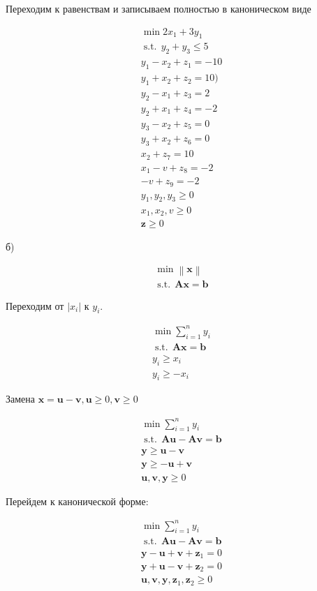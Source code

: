 \documentclass[12pt]{article}
\DeclareMathOperator*{\st}{s.t. }
\newcommand\norm[1]{\left\lVert#1\right\rVert}
\begin{document}
Переходим к равенствам и записываем полностью в каноническом виде

\begin{gather}
\min 2x_1+3y_1\\
\st\,y_2+y_3\leq 5\\
y_1 - x_2 + z_1 = - 10\\
y_1 + x_2 + z_2 = 10)\\
y_2 - x_1 + z_3 = 2\\
y_2 + x_1 + z_4 =  -2\\
y_3 - x_2 + z_5 = 0\\
y_3 + x_2 + z_6 = 0\\
x_2 + z_7 = 10\\
x_1 - v  + z_8 = -2\\
-v + z_9 = -2\\
y_1, y_2, y_3 \geq 0\\
x_1, x_2, v\geq 0\\
\textbf{z} \geq 0
\end{gather} 

б) 

\begin{gather}
\min \norm{\textbf{x}}\\
\st\,\textbf{Ax} = \textbf{b}
\end{gather} 

Переходим от $|x_i|$ к $y_i$.

\begin{gather}
\min \sum\limits_{i=1}^ny_i\\
\st\,\textbf{Ax} = \textbf{b}\\
y_i \geq x_i\\
y_i \geq -x_i
\end{gather}

Замена $\textbf{x} = \textbf{u} - \textbf{v}, \textbf{u}\geq 0, \textbf{v} \geq 0$

\begin{gather}
\min \sum\limits_{i=1}^ny_i\\
\st\,\textbf{Au}-\textbf{Av} = \textbf{b}\\
\textbf{y} \geq \textbf{u} - \textbf{v}\\
\textbf{y} \geq -\textbf{u} + \textbf{v}\\
\textbf{u}, \textbf{v}, \textbf{y} \geq 0
\end{gather}

Перейдем к канонической форме:

\begin{gather}
\min \sum\limits_{i=1}^ny_i\\
\st\,\textbf{Au}-\textbf{Av} = \textbf{b}\\
\textbf{y} - \textbf{u} + \textbf{v} + \textbf{z}_1 = 0\\
\textbf{y} + \textbf{u} - \textbf{v} + \textbf{z}_2 =0\\
\textbf{u}, \textbf{v}, \textbf{y}, \textbf{z}_1, \textbf{z}_2 \geq 0
\end{gather}
\end{document}
